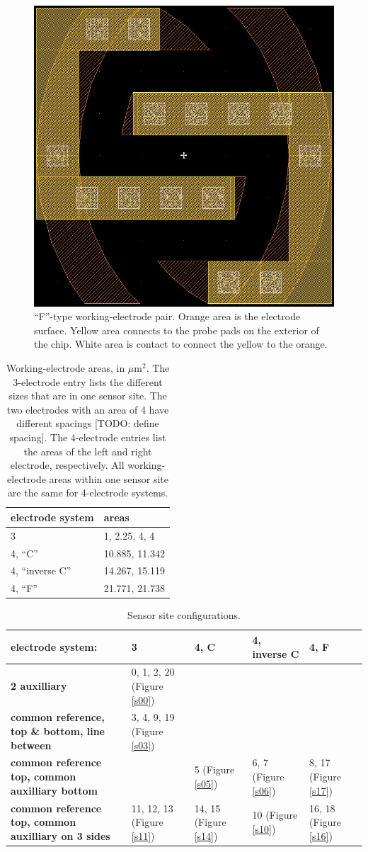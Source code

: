 \begin{figure}
	\centering
	\includegraphics[width=0.3\linewidth]{figures/4-F.png}
	\caption[``F''-type working-electrode pair.]{``F''-type working-electrode pair. Orange area is the electrode surface. Yellow area connects to the probe pads on the exterior of the chip. White area is contact to connect the yellow to the orange.}
	\label{4-F}
\end{figure}

\begin{table}
	\begin{tabular}{l|l}
		\textbf{electrode system} & \textbf{areas} \\
		\hline
		3 & 1, 2.25, 4, 4 \\
		4, ``C'' & 10.885, 11.342 \\
		4, ``inverse C'' & 14.267, 15.119 \\
		4, ``F'' & 21.771, 21.738
	\end{tabular}
	\caption[Working-electrode areas.]{Working-electrode areas, in $\mu \mathrm{m}^2$. The 3-electrode entry lists the different sizes that are in one sensor site. The two electrodes with an area of 4 have different spacings [TODO: define spacing]. The 4-electrode entries list the areas of the left and right electrode, respectively. All working-electrode areas within one sensor site are the same for 4-electrode systems.}
	\label{electrode-area}
\end{table}

\begin{table}
	\begin{tabular}{p{4cm}|p{2cm}|p{2cm}|p{2.5cm}|p{2cm}}
		electrode system: & \textbf{3} & \textbf{4, C} & \textbf{4, inverse C} & \textbf{4, F} \\
		\hline
		\textbf{2 auxilliary} & 0, 1, 2, 20 (Figure \ref{s00}) & & & \\
		\hline
		\textbf{common reference, top \& bottom, line between} & 3, 4, 9, 19 (Figure \ref{s03}) & & & \\
		\hline
		\textbf{common reference top, common auxilliary bottom} & & 5 (Figure \ref{s05}) & 6, 7 (Figure \ref{s06}) & 8, 17 (Figure \ref{s17}) \\
		\hline
		\textbf{common reference top, common auxilliary on 3 sides} & 11, 12, 13 (Figure \ref{s11}) & 14, 15 (Figure \ref{s14}) & 10 (Figure \ref{s10}) & 16, 18 (Figure \ref{s16})
	\end{tabular}
	\caption{Sensor site configurations.}
	\label{sensor-config}
\end{table}

